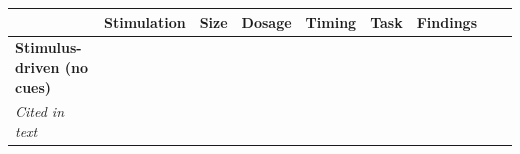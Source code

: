 \documentclass[11pt,]{memoir}
\begin{document}
\begin{longtable}[]{@{}lllllllll@{}}
\begin{minipage}[b]{0.04\columnwidth}
\end{minipage} & \begin{minipage}[b]{0.11\columnwidth}\raggedright
Stimulation\strut
\end{minipage} & \begin{minipage}[b]{0.03\columnwidth}\raggedright
Size\strut
\end{minipage} & \begin{minipage}[b]{0.05\columnwidth}\raggedright
Dosage\strut
\end{minipage} & \begin{minipage}[b]{0.05\columnwidth}\raggedright
Timing\strut
\end{minipage} & \begin{minipage}[b]{0.11\columnwidth}\raggedright
Task\strut
\end{minipage} & \begin{minipage}[b]{0.24\columnwidth}\raggedright
Findings\strut
\end{minipage}\tabularnewline
\midrule
\endhead
\begin{minipage}[t]{0.12\columnwidth}\raggedright
\textbf{Stimulus-driven (no cues)}\strut
\end{minipage} & \begin{minipage}[t]{0.02\columnwidth}\raggedright
\strut
\end{minipage} & \begin{minipage}[t]{0.04\columnwidth}\raggedright
\strut
\end{minipage} & \begin{minipage}[t]{0.11\columnwidth}\raggedright
\strut
\end{minipage} & \begin{minipage}[t]{0.03\columnwidth}\raggedright
\strut
\end{minipage} & \begin{minipage}[t]{0.05\columnwidth}\raggedright
\strut
\end{minipage} & \begin{minipage}[t]{0.05\columnwidth}\raggedright
\strut
\end{minipage} & \begin{minipage}[t]{0.11\columnwidth}\raggedright
\strut
\end{minipage} & \begin{minipage}[t]{0.24\columnwidth}\raggedright
\strut
\end{minipage}\tabularnewline
\begin{minipage}[t]{0.12\columnwidth}\raggedright
\emph{Cited in text}\strut

\end{minipage}
\end{longtable}
\end{document}
